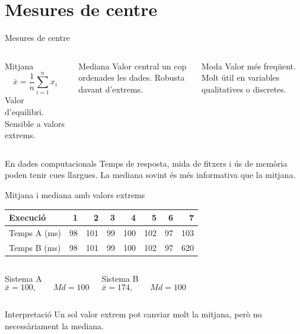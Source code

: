 \documentclass[10pt,aspectratio=169]{beamer}
\begin{document}
\section{Mesures de centre}

\begin{frame}{Mesures de centre}
\begin{columns}[T]
\begin{block}{Mitjana}
\[
\bar{x}=\frac{1}{n}\sum_{i=1}^n x_i
\]
Valor d'equilibri. Sensible a valors extrems.
\end{block}
\begin{block}{Mediana}
Valor central un cop ordenades les dades. Robusta davant d'extrems.
\end{block}
\begin{block}{Moda}
Valor més freqüent. Molt útil en variables qualitatives o discretes.
\end{block}
\end{columns}
\vspace{0.25cm}
\begin{alertblock}{En dades computacionals}
Temps de resposta, mida de fitxers i ús de memòria poden tenir cues llargues. La mediana sovint és més informativa que la mitjana.
\end{alertblock}
\end{frame}

\begin{frame}{Mitjana i mediana amb valors extrems}
\begin{center}
\small
\begin{tabular}{lrrrrrrr}
\toprule
Execució & 1 & 2 & 3 & 4 & 5 & 6 & 7 \\
\midrule
Temps A (ms) & 98 & 101 & 99 & 100 & 102 & 97 & 103 \\
Temps B (ms) & 98 & 101 & 99 & 100 & 102 & 97 & 620 \\
\bottomrule
\end{tabular}
\end{center}
\vspace{0.2cm}
\begin{columns}[T]
\begin{block}{Sistema A}
\[
\bar{x}=100, \qquad Md=100
\]
\end{block}
\begin{block}{Sistema B}
\[
\bar{x}=174, \qquad Md=100
\]
\end{block}
\end{columns}
\vspace{0.25cm}
\begin{alertblock}{Interpretació}
Un sol valor extrem pot canviar molt la mitjana, però no necessàriament la mediana.
\end{alertblock}
\end{frame}
\end{document}
